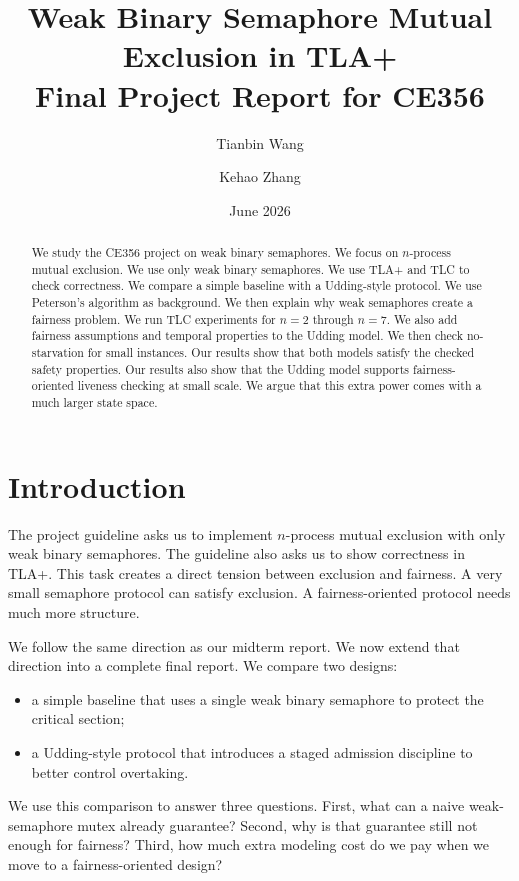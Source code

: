 \documentclass[11pt]{article}
\title{\textbf{Weak Binary Semaphore Mutual Exclusion in TLA+}\\Final Project Report for CE356}
\author{Tianbin Wang \and Kehao Zhang}
\date{June 2026}
\begin{document}
\maketitle

\begin{abstract}
We study the CE356 project on weak binary semaphores. We focus on $n$-process mutual exclusion. We use only weak binary semaphores. We use TLA+ and TLC to check correctness. We compare a simple baseline with a Udding-style protocol. We use Peterson's algorithm as background. We then explain why weak semaphores create a fairness problem. We run TLC experiments for $n=2$ through $n=7$. We also add fairness assumptions and temporal properties to the Udding model. We then check no-starvation for small instances. Our results show that both models satisfy the checked safety properties. Our results also show that the Udding model supports fairness-oriented liveness checking at small scale. We argue that this extra power comes with a much larger state space.
\end{abstract}

\section{Introduction}

The project guideline asks us to implement $n$-process mutual exclusion with only weak binary semaphores. The guideline also asks us to show correctness in TLA+. This task creates a direct tension between exclusion and fairness. A very small semaphore protocol can satisfy exclusion. A fairness-oriented protocol needs much more structure.

We follow the same direction as our midterm report. We now extend that direction into a complete final report. We compare two designs:

\begin{itemize}
  \item a simple baseline that uses a single weak binary semaphore to protect the critical section;
  \item a Udding-style protocol that introduces a staged admission discipline to better control overtaking.
\end{itemize}

We use this comparison to answer three questions. First, what can a naive weak-semaphore mutex already guarantee? Second, why is that guarantee still not enough for fairness? Third, how much extra modeling cost do we pay when we move to a fairness-oriented design?
\end{document}
